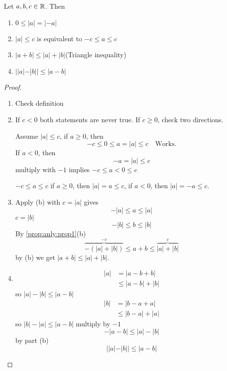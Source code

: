 \documentclass[10pt, a4paper]{article}
\begin{document}
\begin{proposition}\label{prop:anly:prop2}
    Let $a, b, c \in \mathbb{R}$. Then
    \begin{enumerate}[label = (\alph*)]
        \item $0 \leq |a| = |-a|$
        \item $|a| \leq c$ is equivalent to $-c \leq a \leq c$
        \item $|a + b| \leq |a| + |b|$\quad(Triangle inequality)
        \item $||a| - |b|| \leq |a - b|$
    \end{enumerate}

    \begin{proof}\phantom{}
    \begin{enumerate}[label = (\alph*)]
        \item Check definition
        \item 
        If $c < 0$ both statements are never true. If $c \geq 0$, check two directions.

        Assume $|a| \leq c$, if $a \geq 0$, then 
        \[
        -c \leq 0 \leq a = |a| \leq c\quad\text{Works}.
        \]
        If $a < 0$, then 
        \[
        -a = |a| \leq c
        \]
        multiply with $-1$ implies $-c \leq a < 0 \leq c$\quad{}

        $-c \leq a \leq c$ if $a \geq 0$, then $|a| = a \leq c$, if $a < 0$, then $|a| = -a \leq c$.

        \item
        Apply (b) with $c = |a|$ gives
        \[
        -|a| \leq a \leq |a|
        \]
        $c = |b|$
        \[
        -|b| \leq b \leq |b|
        \]
        By \autoref{prop:anly:prop1}(b)
        \[
        \overbrace{-(|a| + |b|)}^{-c} \leq a + b \leq \overbrace{|a| + |b|}^{c}
        \]
        by (b) we get $|a + b| \leq |a| + |b|$.

        \item
        \begin{align*}
            |a| &= |a - b + b| \\
            &\leq |a - b| + |b|
        \end{align*}
        so
        $|a| - |b| \leq |a - b|$
        \begin{align*}
            |b| &= |b - a + a| \\
            &\leq |b - a| + |a|
        \end{align*}
        so $|b| - |a| \leq |a - b|$ multiply by $-1$
        \[
        -|a - b| \leq |a| - |b|
        \]
        by part (b)
        \[
        ||a| - |b|| \leq |a - b|
        \]
    \end{enumerate}
    \end{proof}
\end{proposition}
\end{document}
